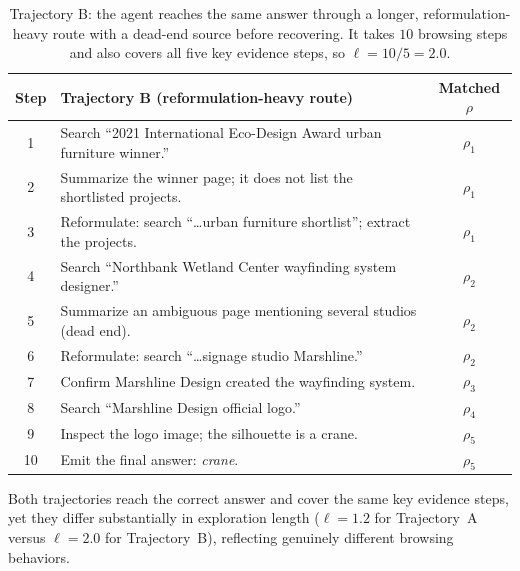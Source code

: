 \begin{table}[H]
\centering
\small
\begin{tabularx}{\textwidth}{@{}c X c@{}}
\toprule
\textbf{Step} & \textbf{Trajectory B (reformulation-heavy route)} & \textbf{Matched $\rho$} \\
\midrule
1  & Search ``2021 International Eco-Design Award urban furniture winner.''            & $\rho_1$ \\
2  & Summarize the winner page; it does not list the shortlisted projects.            & $\rho_1$ \\
3  & Reformulate: search ``\dots urban furniture shortlist''; extract the projects.   & $\rho_1$ \\
4  & Search ``Northbank Wetland Center wayfinding system designer.''                  & $\rho_2$ \\
5  & Summarize an ambiguous page mentioning several studios (dead end).               & $\rho_2$ \\
6  & Reformulate: search ``\dots signage studio Marshline.''                          & $\rho_2$ \\
7  & Confirm Marshline Design created the wayfinding system.                          & $\rho_3$ \\
8  & Search ``Marshline Design official logo.''                                       & $\rho_4$ \\
9  & Inspect the logo image; the silhouette is a crane.                               & $\rho_5$ \\
10 & Emit the final answer: \textit{crane}.                                           & $\rho_5$ \\
\bottomrule
\end{tabularx}
\caption{Trajectory B: the agent reaches the same answer through a longer, reformulation-heavy route with a dead-end source before recovering. It takes $10$ browsing steps and also covers all five key evidence steps, so $\ell = 10/5 = 2.0$.}
\label{tab:traj-B}
\end{table}

Both trajectories reach the correct answer and cover the same key evidence steps, yet they differ substantially in exploration length ($\ell = 1.2$ for Trajectory~A versus $\ell = 2.0$ for Trajectory~B), reflecting genuinely different browsing behaviors.

